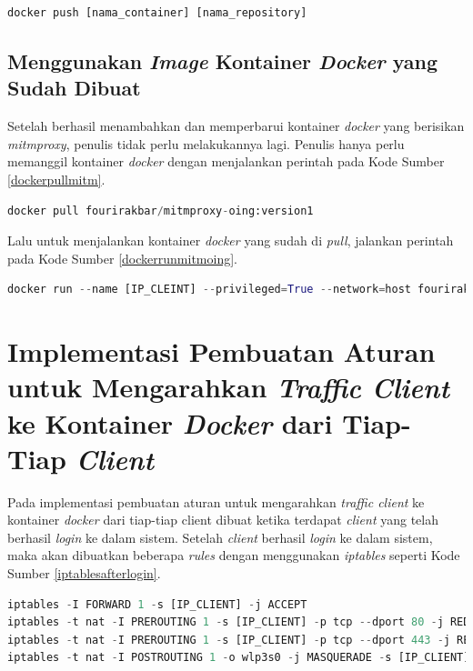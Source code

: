 \newline
\begin{lstlisting}[frame=single,tabsize=2,breaklines,captionpos=b,caption=Perintah untuk \textit{Push Image} ke Docker Hub,language=Python,label=dockerpush]
docker push [nama_container] [nama_repository]
\end{lstlisting}

\subsection{Menggunakan \textit{Image} Kontainer \textit{Docker} yang Sudah Dibuat}
Setelah berhasil menambahkan dan memperbarui kontainer \textit{docker} yang berisikan \textit{mitmproxy}, penulis tidak perlu melakukannya lagi. Penulis hanya perlu memanggil kontainer \textit{docker} dengan menjalankan perintah pada Kode Sumber \ref{dockerpullmitm}.
\newline
\begin{lstlisting}[frame=single,tabsize=2,breaklines,captionpos=b,caption=Perintah untuk \textit{Pull Image mitmproxy},language=Python,label=dockerpullmitm]
docker pull fourirakbar/mitmproxy-oing:version1
\end{lstlisting}

Lalu untuk menjalankan kontainer \textit{docker} yang sudah di \textit{pull}, jalankan perintah pada Kode Sumber \ref{dockerrunmitmoing}.
\newline
\begin{lstlisting}[frame=single,tabsize=2,breaklines,captionpos=b,caption=Perintah untuk \textit{Pull Image mitmproxy},language=Python,label=dockerrunmitmoing]
docker run --name [IP_CLEINT] --privileged=True --network=host fourirakbar/mitmproxy-oing:version1
\end{lstlisting}

\section{Implementasi Pembuatan Aturan untuk Mengarahkan \textit{Traffic Client} ke Kontainer \textit{Docker} dari Tiap-Tiap \textit{Client}}
Pada implementasi pembuatan aturan untuk mengarahkan \textit{traffic client} ke kontainer \textit{docker} dari tiap-tiap client dibuat ketika terdapat \textit{client} yang telah berhasil \textit{login} ke dalam sistem. Setelah \textit{client} berhasil \textit{login} ke dalam sistem, maka akan dibuatkan beberapa \textit{rules} dengan menggunakan \textit{iptables} seperti Kode Sumber \ref{iptablesafterlogin}.
\begin{lstlisting}[frame=single,tabsize=2,breaklines,captionpos=b,caption=Command untuk mengarahkan \textit{client} ke halaman \textit{login},language=Python,label=iptablesafterlogin]
iptables -I FORWARD 1 -s [IP_CLIENT] -j ACCEPT
iptables -t nat -I PREROUTING 1 -s [IP_CLIENT] -p tcp --dport 80 -j REDIRECT --to-ports [PORTS_CLIENT]
iptables -t nat -I PREROUTING 1 -s [IP_CLIENT] -p tcp --dport 443 -j REDIRECT --to-ports [PORTS_CLIENT]
iptables -t nat -I POSTROUTING 1 -o wlp3s0 -j MASQUERADE -s [IP_CLIENT]
\end{lstlisting}

